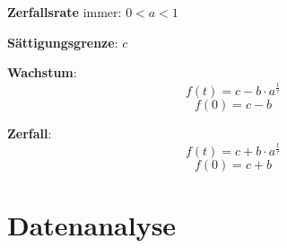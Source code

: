\begin{multicols}
\textbf{Zerfallsrate} immer: $0<a<1$

\textbf{Sättigungsgrenze}: $c$

\textbf{Wachstum}:
$$f(t) = c-b\cdot{}a^\frac{t}\tau$$
$$f(0) = c-b$$

\textbf{Zerfall}:
$$f(t) = c+b\cdot{}a^\frac{t}\tau$$
$$f(0) = c+b$$


\end{multicols}


\newpage
\section*{Datenanalyse}
\vspace{5mm}



